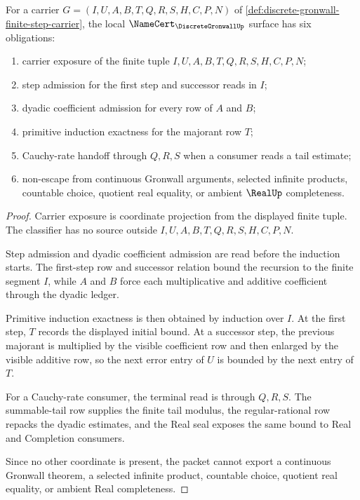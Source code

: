 \begin{theorem}
\label{thm:discrete-gronwall-namecert-obligations}
For a carrier $G=(I,U,A,B,T,Q,R,S,H,C,P,N)$ of \autoref{def:discrete-gronwall-finite-step-carrier}, the local $\NameCert_{\DiscreteGronwallUp}$ surface has six obligations:
\begin{enumerate}
\item carrier exposure of the finite tuple $I,U,A,B,T,Q,R,S,H,C,P,N$;
\item step admission for the first step and successor reads in $I$;
\item dyadic coefficient admission for every row of $A$ and $B$;
\item primitive induction exactness for the majorant row $T$;
\item Cauchy-rate handoff through $Q,R,S$ when a consumer reads a tail estimate;
\item non-escape from continuous Gronwall arguments, selected infinite products, countable choice, quotient real equality, or ambient $\RealUp$ completeness.
\end{enumerate}
\end{theorem}
\begin{proof}
Carrier exposure is coordinate projection from the displayed finite tuple. The classifier has no source outside $I,U,A,B,T,Q,R,S,H,C,P,N$.

Step admission and dyadic coefficient admission are read before the induction starts. The first-step row and successor relation bound the recursion to the finite segment $I$, while $A$ and $B$ force each multiplicative and additive coefficient through the dyadic ledger.

Primitive induction exactness is then obtained by induction over $I$. At the first step, $T$ records the displayed initial bound. At a successor step, the previous majorant is multiplied by the visible coefficient row and then enlarged by the visible additive row, so the next error entry of $U$ is bounded by the next entry of $T$.

For a Cauchy-rate consumer, the terminal read is through $Q,R,S$. The summable-tail row supplies the finite tail modulus, the regular-rational row repacks the dyadic estimates, and the Real seal exposes the same bound to Real and Completion consumers.

Since no other coordinate is present, the packet cannot export a continuous Gronwall theorem, a selected infinite product, countable choice, quotient real equality, or ambient Real completeness.
\end{proof}

